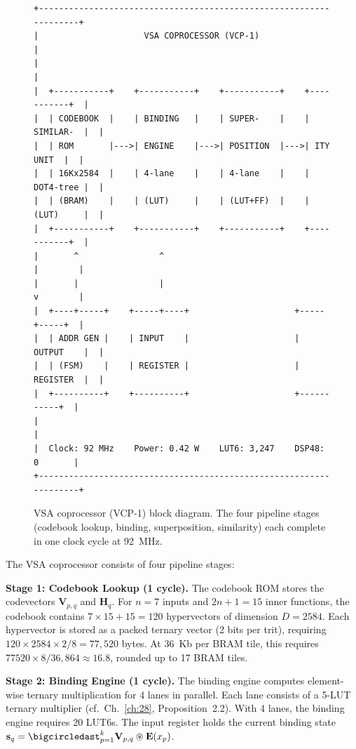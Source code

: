 \begin{figure}[h]
\centering
\begin{verbatim}
+-------------------------------------------------------------------+
|                     VSA COPROCESSOR (VCP-1)                       |
|                                                                   |
|  +-----------+    +-----------+    +-----------+    +-----------+  |
|  | CODEBOOK  |    | BINDING   |    | SUPER-    |    | SIMILAR-  |  |
|  | ROM       |--->| ENGINE    |--->| POSITION  |--->| ITY UNIT  |  |
|  | 16Kx2584  |    | 4-lane    |    | 4-lane    |    | DOT4-tree |  |
|  | (BRAM)    |    | (LUT)     |    | (LUT+FF)  |    | (LUT)     |  |
|  +-----------+    +-----------+    +-----------+    +-----------+  |
|       ^                ^                                 |        |
|       |                |                                 v        |
|  +----+-----+    +-----+----+                     +-----+-----+  |
|  | ADDR GEN |    | INPUT    |                     | OUTPUT    |  |
|  | (FSM)    |    | REGISTER |                     | REGISTER  |  |
|  +----------+    +----------+                     +-----------+  |
|                                                                   |
|  Clock: 92 MHz    Power: 0.42 W    LUT6: 3,247    DSP48: 0       |
+-------------------------------------------------------------------+
\end{verbatim}
\caption{VSA coprocessor (VCP-1) block diagram. The four pipeline stages
(codebook lookup, binding, superposition, similarity) each complete in one
clock cycle at 92~MHz.}
\label{fig:hwbridge:vcp-block}
\end{figure}

The VSA coprocessor consists of four pipeline stages:

\textbf{Stage 1: Codebook Lookup (1 cycle).}
The codebook ROM stores the codevectors $\mathbf{V}_{p,q}$ and $\mathbf{H}_q$.
For $n = 7$ inputs and $2n+1 = 15$ inner functions, the codebook contains
$7 \times 15 + 15 = 120$ hypervectors of dimension $D = 2584$.
Each hypervector is stored as a packed ternary vector (2 bits per trit),
requiring $120 \times 2584 \times 2 / 8 = 77,520$ bytes.
At 36~Kb per BRAM tile, this requires $77520 \times 8 / 36{,}864 \approx 16.8$,
rounded up to 17 BRAM tiles.

\textbf{Stage 2: Binding Engine (1 cycle).}
The binding engine computes element-wise ternary multiplication for 4 lanes
in parallel. Each lane consists of a 5-LUT ternary multiplier
(cf.\ Ch.~\ref{ch:28}, Proposition~2.2). With 4 lanes, the binding engine
requires 20 LUT6s. The input register holds the current binding state
$\mathbf{s}_q = \bigcircledast_{p=1}^{k} \mathbf{V}_{p,q} \circledast \mathbf{E}(x_p)$.

